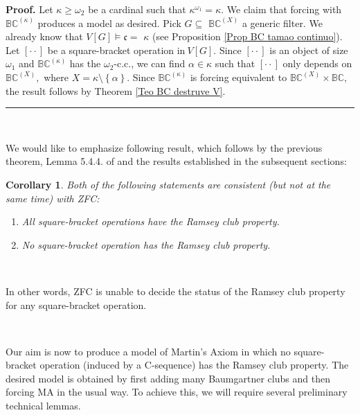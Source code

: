 \documentclass{article}
\newtheorem{corollary}[theorem]{Corollary}
\newenvironment{proof}[1][Proof]{\noindent\textbf{#1.} }{\ \rule{0.5em}{0.5em}}
\begin{document}
\begin{proof}
Let $\kappa\geq\omega_{2}$ be a cardinal such that $\kappa^{\omega_{1}}%
=\kappa.$ We claim that forcing with $\mathbb{BC}^{\left(  \kappa\right)  }$
produces a model as desired. Pick $G\subseteq$ $\mathbb{BC}^{\left(  X\right)
}$ a generic filter. We already know that $V\left[  G\right]  \models
\mathfrak{c}=$ $\kappa$ (see Proposition \ref{Prop BC tamao continuo}). Let
$[\cdot\cdot]$ be a square-bracket operation in$\ V\left[  G\right]  .$ Since
$[\cdot\cdot]$ is an object of size $\omega_{1}$ and $\mathbb{BC}^{\left(
\kappa\right)  }$ has the $\omega_{2}$\textsf{-c.c.}, we can find $\alpha
\in\kappa$ such that $[\cdot\cdot]$ only depends on $\mathbb{BC}^{\left(
X\right)  },$ where $X=\kappa\setminus\left\{  \alpha\right\}  .$ Since
$\mathbb{BC}^{\left(  \kappa\right)  }$ is forcing equivalent to
$\mathbb{BC}^{\left(  X\right)  }\times\mathbb{BC},$ the result follows by
Theorem \ref{Teo BC destruve V}.
\end{proof}

\qquad\ \qquad\ \ \ \ \ \qquad\ \ \ \qquad\ \ \qquad\ \ \ 

We would like to emphasize following result, which follows by the previous
theorem, Lemma 5.4.4. of \cite{Walks} and the results established in the
subsequent sections:

\begin{corollary}
Both of the following statements are consistent (but not at the same time)
with \textsf{ZFC:}

\begin{enumerate}
\item All square-bracket operations have the Ramsey club property.

\item No square-bracket operation has the Ramsey club property.\textsf{ }
\end{enumerate}
\end{corollary}

\qquad\ \qquad\ \ \ \ 

In other words, \textsf{ZFC }is unable to decide the status of the Ramsey club
property for any square-bracket operation.

\qquad\ \qquad\ \qquad\ \qquad\ \ \ \ \qquad\ \ 

Our aim is now to produce a model of Martin's Axiom\textsf{ }in which no
square-bracket operation (induced by a \textsf{C}-sequence) has the Ramsey
club property. The desired model is obtained by first adding many Baumgartner
clubs and then forcing \textsf{MA} in the usual way. To achieve this, we will
require several preliminary technical lemmas.
\end{document}
